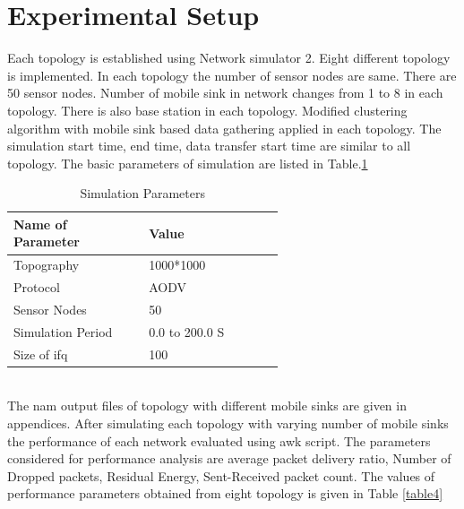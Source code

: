 \documentclass[MTech]{iitmdiss}
\begin{document}
\section{Experimental Setup}
Each topology is established using Network simulator 2. Eight different topology is implemented. In each topology the number of sensor nodes are same. There are 50 sensor nodes. Number of mobile sink in network changes from 1 to 8 in each topology. There is also base station in each topology. Modified clustering algorithm with mobile sink based data gathering applied in each topology. The simulation start time, end time, data transfer start time are similar to all topology.
The basic parameters of simulation are listed in  Table.\ref{table3}
\\
\begin{table}[ht]
\centering
\renewcommand\arraystretch{2.4} \setlength\minrowclearance{2.4pt}
\caption{\label{table3} Simulation Parameters}
\vspace{5mm}
{
\hfill{}
\begin{tabular}{|p{0.3\linewidth}|p{0.3\linewidth}|}
  \hline
 \textbf{Name of Parameter } & \textbf{Value}  \\ 
 \hline
 Topography  & 1000*1000  \\ 
 \hline
 Protocol  & AODV  \\
 \hline
 Sensor Nodes & 50 \\  
 \hline
 Simulation Period  & 0.0 to 200.0 S\\ 
 \hline
 Size of ifq  & 100  \\ 
\hline
\end{tabular}}
\hfill{}
\end{table}
\\
The nam output files of topology with different mobile sinks are given in appendices. After simulating each topology with varying number of mobile sinks the performance of each network evaluated using awk script. The parameters considered for performance analysis are average packet delivery ratio, Number of Dropped packets, Residual Energy, Sent-Received packet count. The values of performance parameters obtained from eight topology is given in Table \ref{table4}
\newpage
\end{document}
